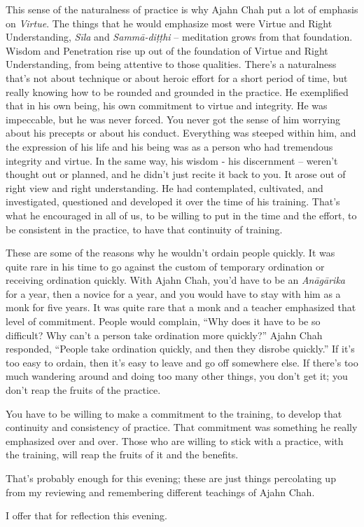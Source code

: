 This sense of the naturalness of practice is why Ajahn Chah put a lot of
emphasis on \emph{Virtue}. The things that he would emphasize most were
Virtue and Right Understanding, \emph{Sīla} and \emph{Sammā-diṭṭhi} -- meditation
grows from that foundation. Wisdom and Penetration rise up out of the
foundation of Virtue and Right Understanding, from being attentive to
those qualities.  There's a naturalness that's not about technique or
about heroic effort for a short period of time, but really knowing how
to be rounded and grounded in the practice. He exemplified that in his
own being, his own commitment to virtue and integrity. He was
impeccable, but he was never forced. You never got the sense of him
worrying about his precepts or about his conduct. Everything was steeped
within him, and the expression of his life and his being was as a person
who had tremendous integrity and virtue. In the same way, his wisdom -
his discernment -- weren't thought out or planned, and he didn't just
recite it back to you. It arose out of right view and right
understanding. He had contemplated, cultivated, and investigated, 
questioned and developed it over the time of his training. That's what
he encouraged in all of us, to be willing to put in the time and the
effort, to be consistent in the practice, to have that continuity of
training. 

These are some of the reasons why he wouldn't ordain people quickly. It
was quite rare in his time to go against the custom of temporary
ordination or receiving ordination quickly.  With Ajahn Chah, you'd have
to be an \emph{Anāgārika} for a year, then a novice for a year, and you would
have to stay with him as a monk for five years. It was quite rare that a
monk and a teacher emphasized that level of commitment. People would
complain, ``Why does it have to be so difficult? Why can't a person take
ordination more quickly?'' Ajahn Chah responded, ``People take
ordination quickly, and then they disrobe quickly.'' If it's too easy to
ordain, then it's easy to leave and go off somewhere else. If there's
too much wandering around and doing too many other things, you don't get
it; you don't reap the fruits of the practice. 

You have to be willing to make a commitment to the training, to develop
that continuity and consistency of practice. That commitment was
something he really emphasized over and over.  Those who are willing to
stick with a practice, with the training, will reap the fruits of it and
the benefits. 

That's probably enough for this evening; these are just things
percolating up from my reviewing and remembering different teachings of
Ajahn Chah. 

I offer that for reflection this evening. 

